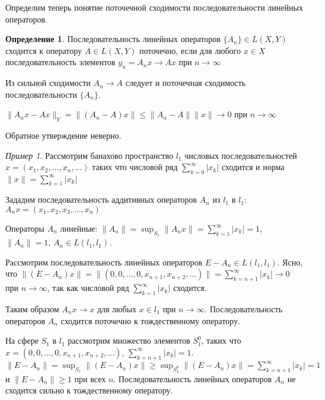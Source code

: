 \documentclass[12pt,a4paper,titlepage,oneside]{book}
\theoremstyle{definition}
\newtheorem*{definition}{Определение}
\theoremstyle{plain}
\theoremstyle{remark}
\theoremstyle{remark}
\newtheorem*{example}{Пример}
\theoremstyle{remark}
\theoremstyle{remark}
\theoremstyle{plain}
\theoremstyle{plain}
\begin{document}
Определим теперь понятие поточечной сходимости последовательности линейных операторов.

\begin{definition}
Последовательность линейных операторов $\{A_n\}\in L(X,Y)$ сходится к оператору $A\in L(X,Y)$ поточечно, если для любого $x\in X$ последовательность элементов $y_n=A_nx\to Ax$ при $n\to \infty$
\end{definition}

Из сильной сходимости $A_n\to A$ следует и поточечная сходимость последовательности $\{A_n\}$.

\begin{center}
$\parallel A_nx-Ax\parallel_Y = \parallel(A_n-A)x\parallel\le \parallel A_n-A\parallel \parallel x\parallel\to 0$ при $n\to \infty$
\end{center}

Обратное утверждение неверно.

\begin{example}
Рассмотрим банахово пространство $l_1$ числовых последовательностей $x=(x_1,x_2,...,x_n,...)$ таких что числовой ряд $\displaystyle\sum_{k=0}^\infty \lvert x_k\rvert $ сходится и норма $\parallel x\parallel=\displaystyle\sum_{k=1}^\infty \lvert x_k\rvert $

Зададим последовательность аддитивных операторов $A_n$ из $l_1$ в $l_1$:
$A_nx=(x_1,x_2,x_3,...,x_n)$

Операторы $A_n$ линейные:
$\parallel A_n\parallel=\sup_{S_1} \parallel A_nx\parallel=\displaystyle\sum_{k=1}^\infty \lvert x_k\rvert =1$, $\parallel A_n\parallel=1$, $A_n\in L(l_1,l_1)$.

Рассмотрим последовательность линейных операторов $E-A_n\in L(l_1,l_1)$. Ясно, что $\parallel(E-A_n)x\parallel=\parallel(0,0,...,0,x_{n+1},x_{n+2},...)\parallel=\displaystyle\sum_{k=n+1}^\infty \lvert x_k\rvert  \to 0$ при $n\to \infty$, так как числовой ряд $\displaystyle\sum_{k=1}^\infty \lvert x_k\rvert $ сходится.

Таким образом $A_nx\to x$ для любых $x\in l_1$ при $n\to \infty$. Последовательность операторов $A_n$ сходится поточечно к тождественному оператору.

На сфере $S_1$ в $l_1$ рассмотрим множество элементов $S_1^0$, таких что $x=(0,0,...,0,x_{n+1},x_{n+2},...)$, $\displaystyle\sum_{k=n+1}^\infty \lvert x_k\rvert=1$.
$\parallel E-A_n\parallel=\sup_{S_1} \parallel(E-A_n)x\parallel\ge \sup_{S_1^0} \parallel(E-A_n)x\parallel=\displaystyle\sum_{k=n+1}^\infty \lvert x_k\rvert=1$ и $\parallel E-A_n\parallel\ge 1$ при всех $n$. Последовательность линейных операторов $A_n$ не сходится сильно к тождественному оператору.

\end{example}
\end{document}
